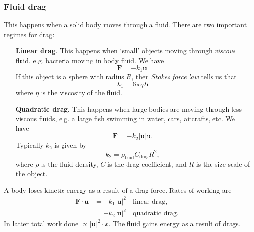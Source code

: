 \subsubsection*{Fluid drag}
This happens when a solid body moves through a fluid. There are two important regimes for drag:
\begin{enumerate}[align=left]
    \item[\textbf{Linear drag}.] This happens when `small' objects moving through \textit{viscous} fluid, e.g. bacteria moving in body fluid. We have 
    \[
        \mathbf{F} = -k_1\mathbf{u}.
    \]
    If this object is a sphere with radius $R$, then \textit{Stokes force law} tells us that
    \[
        k_1 = 6\pi \eta R
    \]
    where $\eta$ is the viscosity of the fluid.
    \item[\textbf{Quadratic drag}.] This happens when large bodies are moving through less viscous fluids, e.g. a large fish swimming in water, cars, aircrafts, etc. We have 
    \[
        \mathbf{F} = -k_2 |\mathbf{u}|\mathbf{u}.
    \]
    Typically $k_2$ is given by 
    \[
        k_2 = \rho_{\text{fluid}}C_{\text{drag}}R^2,
    \]
    where $ \rho $ is the fluid density, $C$ is the drag coefficient, and $R$ is the size scale of the object.
\end{enumerate}

A body loses kinetic energy as a result of a drag force. Rates of working are 
\begin{align*}
    \mathbf{F}\cdot\mathbf{u} &= -k_1|\mathbf{u}|^2\quad \text{linear drag,}\\
    &= -k_2|\mathbf{u}|^3\quad \text{quadratic drag.} 
\end{align*}
In latter total work done $ \propto |\mathbf{u}|^2\cdot x $. The fluid gains energy as a result of drags.

